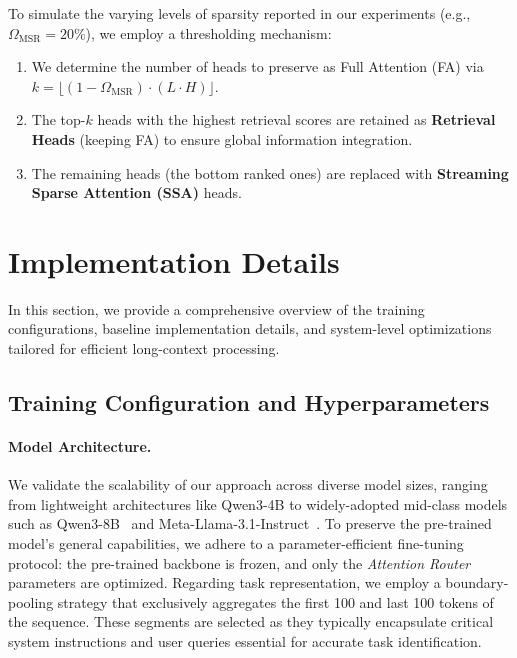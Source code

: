 To simulate the varying levels of sparsity reported in our experiments (e.g., $\Omega_{\mathrm{MSR}} = 20\%$), we employ a thresholding mechanism:
\begin{enumerate}
    \item We determine the number of heads to preserve as Full Attention (FA) via $k = \lfloor (1-\Omega_{\mathrm{MSR}}) \cdot (L \cdot H) \rfloor$.
    \item The top-$k$ heads with the highest retrieval scores are retained as \textbf{Retrieval Heads} (keeping FA) to ensure global information integration.
    \item The remaining heads (the bottom ranked ones) are replaced with \textbf{Streaming Sparse Attention (SSA)} heads.
\end{enumerate}





\section{Implementation Details}
\label{appendix:implementation_details}

In this section, we provide a comprehensive overview of the training configurations, baseline implementation details, and system-level optimizations tailored for efficient long-context processing.

\subsection{Training Configuration and Hyperparameters}
\label{appendix:train_setting}

\paragraph{Model Architecture.}
We validate the scalability of our approach across diverse model sizes, ranging from lightweight architectures like Qwen3-4B to widely-adopted mid-class models such as Qwen3-8B~\citep{yang2025qwen3technicalreport} and Meta-Llama-3.1-Instruct~\citep{grattafiori2024llama}.
To preserve the pre-trained model's general capabilities, we adhere to a parameter-efficient fine-tuning protocol: the pre-trained backbone is frozen, and only the \textit{Attention Router} parameters are optimized.
Regarding task representation, we employ a boundary-pooling strategy that exclusively aggregates the first 100 and last 100 tokens of the sequence. These segments are selected as they typically encapsulate critical system instructions and user queries essential for accurate task identification.

